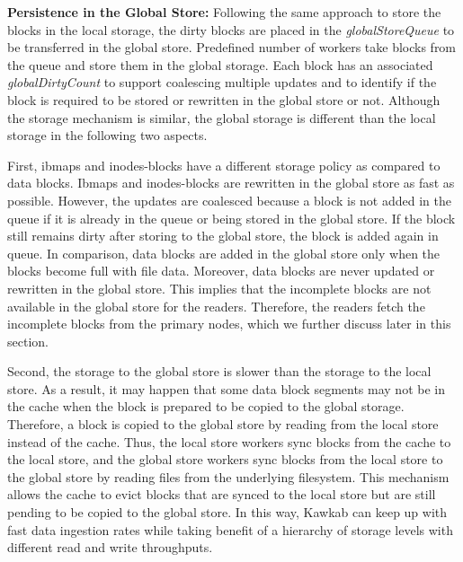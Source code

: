 \documentclass[]{article}
\newcommand{\subtopic}[1]{\vspace{1.5pt} \noindent \textbf{#1}}
\begin{document}



\subtopic{Persistence in the Global Store:} Following the same approach to
store the blocks in the local storage, the dirty blocks are placed in the
\textit{globalStoreQueue} to be transferred in the global store. Predefined
number of workers take blocks from the queue and store them in the
global storage. Each block has an associated \textit{globalDirtyCount}
to support coalescing multiple updates and to identify if the block
is required to be stored or rewritten in the global store or not.
Although the storage mechanism is similar, the global storage is different 
than the local storage in the following two aspects.

First, ibmaps and inodes-blocks have a different storage policy as compared to
data blocks. Ibmaps and inodes-blocks are rewritten in the global store as fast
as possible. However, the updates are coalesced because a block is not added in
the queue if it is already in the queue or being stored in the global store. If
the block still remains dirty after storing to the global store, the block is
added again in queue. In comparison, data blocks are added in the global store
only when the blocks become full with file data.  Moreover, data blocks are
never updated or rewritten in the global store.  This implies that the
incomplete blocks are not available in the global store for the readers.
Therefore, the readers fetch the incomplete blocks from the primary nodes,
which we further discuss later in this section.

Second, the storage to the global store is slower than the storage to the local
store. As a result, it may happen that some data block segments may not be in
the cache when the block is prepared to be copied to the global storage.
Therefore, a block is copied to the global store by reading from the local
store instead of the cache. Thus, the local store workers sync blocks from the
cache to the local store, and the global store workers sync blocks from the
local store to the global store by reading files from the underlying
filesystem. This mechanism allows the cache to evict blocks that are synced to
the local store but are still pending to be copied to the global store.  In
this way, Kawkab can keep up with fast data ingestion rates while taking
benefit of a hierarchy of storage levels with different read and write
throughputs. 
\end{document}
